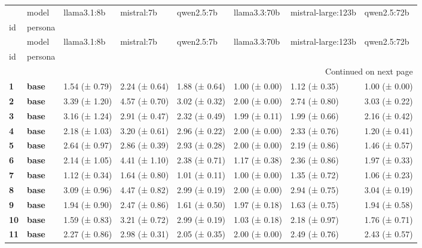 \begin{longtable}{llllllll}
\toprule
 & model & llama3.1:8b & mistral:7b & qwen2.5:7b & llama3.3:70b & mistral-large:123b & qwen2.5:72b \\
id & persona &  &  &  &  &  &  \\
\midrule
\endfirsthead
\toprule
 & model & llama3.1:8b & mistral:7b & qwen2.5:7b & llama3.3:70b & mistral-large:123b & qwen2.5:72b \\
id & persona &  &  &  &  &  &  \\
\midrule
\endhead
\midrule
\multicolumn{8}{r}{Continued on next page} \\
\midrule
\endfoot
\bottomrule
\endlastfoot
\textbf{1} & \textbf{base} & 1.54 (± 0.79) & 2.24 (± 0.64) & 1.88 (± 0.64) & 1.00 (± 0.00) & 1.12 (± 0.35) & 1.00 (± 0.00) \\
\cline{1-8}
\textbf{2} & \textbf{base} & 3.39 (± 1.20) & 4.57 (± 0.70) & 3.02 (± 0.32) & 2.00 (± 0.00) & 2.74 (± 0.80) & 3.03 (± 0.22) \\
\cline{1-8}
\textbf{3} & \textbf{base} & 3.16 (± 1.24) & 2.91 (± 0.47) & 2.32 (± 0.49) & 1.99 (± 0.11) & 1.99 (± 0.66) & 2.16 (± 0.42) \\
\cline{1-8}
\textbf{4} & \textbf{base} & 2.18 (± 1.03) & 3.20 (± 0.61) & 2.96 (± 0.22) & 2.00 (± 0.00) & 2.33 (± 0.76) & 1.20 (± 0.41) \\
\cline{1-8}
\textbf{5} & \textbf{base} & 2.64 (± 0.97) & 2.86 (± 0.39) & 2.93 (± 0.28) & 2.00 (± 0.00) & 2.19 (± 0.86) & 1.46 (± 0.57) \\
\cline{1-8}
\textbf{6} & \textbf{base} & 2.14 (± 1.05) & 4.41 (± 1.10) & 2.38 (± 0.71) & 1.17 (± 0.38) & 2.36 (± 0.86) & 1.97 (± 0.33) \\
\cline{1-8}
\textbf{7} & \textbf{base} & 1.12 (± 0.34) & 1.64 (± 0.80) & 1.01 (± 0.11) & 1.00 (± 0.00) & 1.35 (± 0.72) & 1.06 (± 0.23) \\
\cline{1-8}
\textbf{8} & \textbf{base} & 3.09 (± 0.96) & 4.47 (± 0.82) & 2.99 (± 0.19) & 2.00 (± 0.00) & 2.94 (± 0.75) & 3.04 (± 0.19) \\
\cline{1-8}
\textbf{9} & \textbf{base} & 1.94 (± 0.90) & 2.47 (± 0.86) & 1.61 (± 0.50) & 1.97 (± 0.18) & 1.63 (± 0.75) & 1.94 (± 0.58) \\
\cline{1-8}
\textbf{10} & \textbf{base} & 1.59 (± 0.83) & 3.21 (± 0.72) & 2.99 (± 0.19) & 1.03 (± 0.18) & 2.18 (± 0.97) & 1.76 (± 0.71) \\
\cline{1-8}
\textbf{11} & \textbf{base} & 2.27 (± 0.86) & 2.98 (± 0.31) & 2.05 (± 0.35) & 2.00 (± 0.00) & 2.49 (± 0.76) & 2.43 (± 0.57) \\

\end{longtable}
